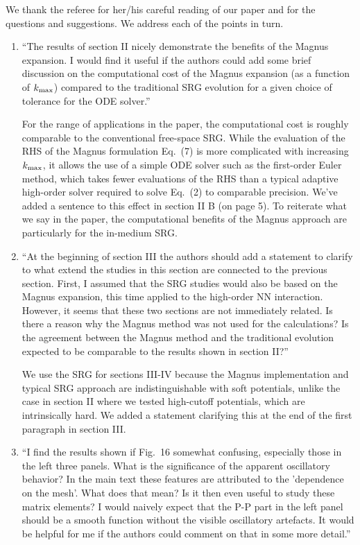 \documentclass[preprintnumbers,floatfix,aps,prc,preprint,nofootinbib]{revtex4-1}
\begin{document}
We thank the referee for her/his careful reading of our paper and for the questions and suggestions. We address each of the points in turn.

\begin{enumerate}

    \item ``The results of section II nicely demonstrate the benefits of the Magnus expansion. I would find it useful if the authors could add some brief discussion on the computational cost of the Magnus expansion (as a function of $k_{\rm max}$) compared to the traditional SRG evolution for a given choice of tolerance for the ODE solver.''
    

    For the range of applications in the paper, the computational cost is roughly comparable to the conventional free-space SRG.
    While the evaluation of the RHS of the Magnus formulation Eq.~(7) is more complicated with increasing $k_{\rm max}$, it allows the use of a simple ODE solver such as the first-order Euler method, which takes fewer evaluations of the RHS than a typical adaptive high-order solver required to solve Eq.~(2) to comparable precision.
    We've added a sentence to this effect in section II B (on page 5).
    To reiterate what we say in the paper, the computational benefits of the Magnus approach are particularly for the in-medium SRG.
    
    
    \item ``At the beginning of section III the authors should add a statement to clarify to what extend the studies in this section are connected to the previous section. First, I assumed that the SRG studies would also be based on the Magnus expansion, this time applied to the high-order NN interaction. However, it seems that these two sections are not immediately related. Is there a reason why the Magnus method was not used for the calculations? Is the agreement between the Magnus method and the traditional evolution expected to be comparable to the results shown in section II?''

    
    We use the SRG for sections III-IV because the Magnus implementation and typical SRG approach are indistinguishable with soft potentials, unlike the case in section II where we tested high-cutoff potentials, which are intrinsically hard. We added a statement clarifying this at the end of the first paragraph in section III.
    
    \item ``I find the results shown if Fig.~16 somewhat confusing, especially those in the left three panels. What is the significance of the apparent oscillatory behavior? In the main text these features are attributed to the 'dependence on the mesh'. What does that mean? Is it then even useful to study these matrix elements? I would naively expect that the P-P part in the left panel should be a smooth function without the visible oscillatory artefacts. It would be helpful for me if the authors could comment on that in some more detail.''
    

\end{enumerate}
\end{document}
